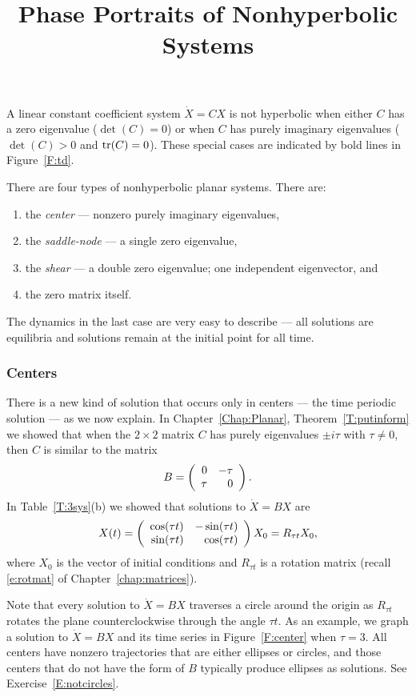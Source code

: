 \documentclass{ximera}
\title{Phase Portraits of Nonhyperbolic Systems}
\begin{document}
\begin{abstract}
\end{abstract}
\maketitle

 \label{S:6.9}

A linear constant coefficient system $\dot{X}=CX$ is not hyperbolic
when either $C$ has a zero eigenvalue ($\det(C)=0$) or when $C$ has
purely imaginary eigenvalues ($\det(C)>0$ and ${\rm tr}(C)=0$).  These
special cases are indicated by bold lines in Figure~\ref{F:td}.

There are four types of nonhyperbolic planar systems.  There are:
\begin{enumerate}
\item	the {\em center} --- nonzero purely imaginary
eigenvalues,
\item	the {\em saddle-node\/} --- a single
zero eigenvalue,
\item	the {\em shear\/} --- a double zero eigenvalue;
one  independent eigenvector, and
\item	the zero matrix itself.
\end{enumerate}
The dynamics in the last case are very easy to describe --- all solutions
are equilibria and solutions remain at the initial point for all time.

\subsubsection*{Centers}

There is a new kind of solution that occurs only in centers --- the time
periodic solution --- as we now explain.
In Chapter~\ref{Chap:Planar},
Theorem~\ref{T:putinform} we showed that when the $2\times 2$
matrix $C$ has purely eigenvalues $\pm i\tau$ with $\tau\neq 0$, then $C$
is similar to the matrix
\[
B =   \left(\begin{array}{rr} 0 & -\tau\\ \tau &0\end{array}\right).
\]
In Table~\ref{T:3sys}(b) we showed that solutions to $\dot{X}=BX$ are
\[
X(t) = \left(\begin{array}{rr} \cos(\tau t) & -\sin(\tau t)\\ \sin(\tau t) &\cos(\tau t)\end{array}\right)X_0
=R_{\tau t}X_0,
\]
where $X_0$ is the vector of initial conditions and $R_{\tau t}$ is a
rotation matrix (recall \eqref{e:rotmat} of Chapter~\ref{chap:matrices}).

Note that every solution to $\dot{X}=BX$ traverses a circle around the
origin as $R_{\tau t}$ rotates the plane counterclockwise through the angle
$\tau t$.  As an example, we graph
a solution to $\dot{X}=BX$ and its time
series in Figure~\ref{F:center} when $\tau=3$.  All centers have nonzero
trajectories that are either ellipses or circles, and
those centers that do
not have the form of $B$ typically produce ellipses as solutions.  See
Exercise~\ref{E:notcircles}.
\end{document}
